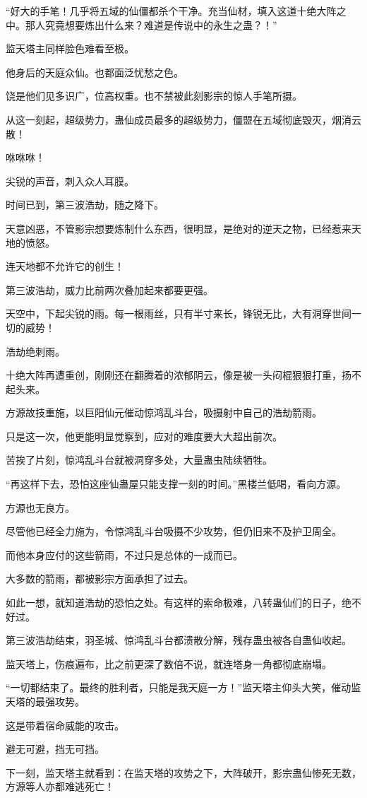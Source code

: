 \begin{this_body}
“好大的手笔！几乎将五域的仙僵都杀个干净。充当仙材，填入这道十绝大阵之中。那人究竟想要炼出什么来？难道是传说中的永生之蛊？！”

监天塔主同样脸色难看至极。

他身后的天庭众仙。也都面泛忧愁之色。

饶是他们见多识广，位高权重。也不禁被此刻影宗的惊人手笔所摄。

从这一刻起，超级势力，蛊仙成员最多的超级势力，僵盟在五域彻底毁灭，烟消云散！

咻咻咻！

尖锐的声音，刺入众人耳膜。

时间已到，第三波浩劫，随之降下。

天意凶恶，不管影宗想要炼制什么东西，很明显，是绝对的逆天之物，已经惹来天地的愤怒。

连天地都不允许它的创生！

第三波浩劫，威力比前两次叠加起来都要更强。

天空中，下起尖锐的雨。每一根雨丝，只有半寸来长，锋锐无比，大有洞穿世间一切的威势！

浩劫绝刺雨。

十绝大阵再遭重创，刚刚还在翻腾着的浓郁阴云，像是被一头闷棍狠狠打重，扬不起头来。

方源故技重施，以巨阳仙元催动惊鸿乱斗台，吸摄射中自己的浩劫箭雨。

只是这一次，他更能明显觉察到，应对的难度要大大超出前次。

苦挨了片刻，惊鸿乱斗台就被洞穿多处，大量蛊虫陆续牺牲。

“再这样下去，恐怕这座仙蛊屋只能支撑一刻的时间。”黑楼兰低喝，看向方源。

方源也无良方。

尽管他已经全力施为，令惊鸿乱斗台吸摄不少攻势，但仍旧来不及护卫周全。

而他本身应付的这些箭雨，不过只是总体的一成而已。

大多数的箭雨，都被影宗方面承担了过去。

如此一想，就知道浩劫的恐怕之处。有这样的索命极难，八转蛊仙们的日子，绝不好过。

第三波浩劫结束，羽圣城、惊鸿乱斗台都溃散分解，残存蛊虫被各自蛊仙收起。

监天塔上，伤痕遍布，比之前更深了数倍不说，就连塔身一角都彻底崩塌。

“一切都结束了。最终的胜利者，只能是我天庭一方！”监天塔主仰头大笑，催动监天塔的最强攻势。

这是带着宿命威能的攻击。

避无可避，挡无可挡。

下一刻，监天塔主就看到：在监天塔的攻势之下，大阵破开，影宗蛊仙惨死无数，方源等人亦都难逃死亡！

\end{this_body}

